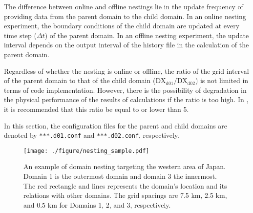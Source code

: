 The difference between online and offline nestings lie in the update frequency of providing data from the parent domain to the child domain. In an online nesting experiment, the boundary conditions of the child domain are updated at every time step ($\Delta t$) of the parent domain. In an offline nesting experiment, the update interval depends on the output interval of the history file in the calculation of the parent domain. 

Regardless of whether the nesting is online or offline, the ratio of the grid interval of the parent domain to that of the child domain  ($\mathrm{DX}_{\mathrm{d01}}/\mathrm{DX}_{\mathrm{d02}}$) is not limited in terms of code implementation. However, there is the possibility of degradation in the physical performance of the results of calculations if the ratio is too high. In \scalerm, it is recommended that this ratio be equal to or lower than 5.

In this section, the configuration files for the parent and child domains
are denoted by \verb|***.d01.conf| and \verb|***.d02.conf|, respectively.

\begin{figure}[t]
\begin{center}
  \texttt{[image: ./figure/nesting\_sample.pdf]}\\
  \caption{An example of domain nesting targeting the western area of Japan.
    Domain 1 is the outermost domain and domain 3 the innermost.
    The red rectangle and lines represents the domain’s location and its relations with other domains.
    The grid spacings are 7.5 km, 2.5 km, and 0.5 km for Domains 1, 2, and 3, respectively.
  }
  \label{fig_nestsample}
\end{center}
\end{figure}



